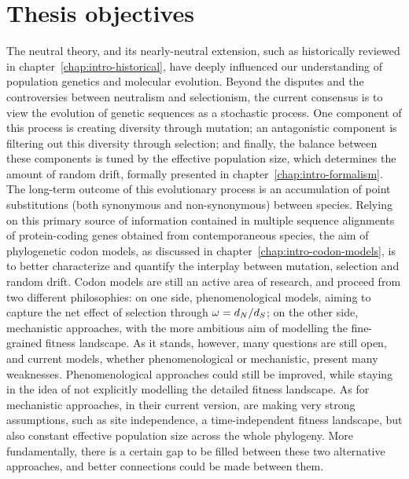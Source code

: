\chapter{Thesis objectives}
{\hypersetup{linkcolor=GREYDARK}\minitoc}
\label{chap:goals}

The \gls{neutral} theory, and its \gls{nearly-neutral} extension, such as historically reviewed in chapter~\ref{chap:intro-historical}, have deeply influenced our understanding of population genetics and molecular evolution.
Beyond the disputes and the controversies between neutralism and selectionism, the current consensus is to view the evolution of genetic sequences as a stochastic process.
One component of this process is creating diversity through mutation; an antagonistic component is filtering out this diversity through selection; and finally, the balance between these components is tuned by the \gls{effective population size}, which determines the amount of random drift, formally presented in chapter~\ref{chap:intro-formalism}.
The long-term outcome of this evolutionary process is an accumulation of point \glspl{substitution} (both \gls{synonymous} and non-synonymous) between species.
Relying on this primary source of information contained in multiple sequence alignments of protein-coding genes obtained from contemporaneous species, the aim of phylogenetic \gls{codon} models, as discussed in chapter~\ref{chap:intro-codon-models}, is to better characterize and quantify the interplay between mutation, selection and random drift.
Codon models are still an active area of research, and proceed from two different philosophies: on one side, phenomenological models, aiming to capture the net effect of selection through $\omega = d_N / d_S$; on the other side, mechanistic approaches, with the more ambitious aim of modelling the fine-grained fitness landscape.
As it stands, however, many questions are still open, and current models, whether phenomenological or mechanistic, present many weaknesses.
Phenomenological approaches could still be improved, while staying in the idea of not explicitly modelling the detailed fitness landscape.
As for mechanistic approaches, in their current version, are making very strong assumptions, such as site independence, a time-independent fitness landscape, but also constant \gls{effective population size} across the whole phylogeny.
More fundamentally, there is a certain gap to be filled between these two alternative approaches, and better connections could be made between them.

